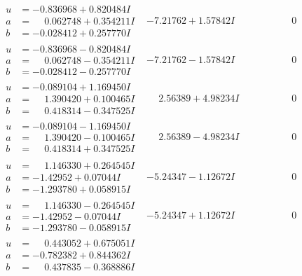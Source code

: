 \documentclass[1p]{elsarticle_modified}
\theoremstyle{definition}
\begin{document}
$$\begin{array}{c|c|c}
\begin{aligned}
u &= -0.836968 + 0.820484 I \\
a &= \phantom{-}0.062748 + 0.354211 I \\
b &= -0.028412 + 0.257770 I\end{aligned}
 & -7.21762 + 1.57842 I & \phantom{-0.000000 } 0 \\ \hline\begin{aligned}
u &= -0.836968 - 0.820484 I \\
a &= \phantom{-}0.062748 - 0.354211 I \\
b &= -0.028412 - 0.257770 I\end{aligned}
 & -7.21762 - 1.57842 I & \phantom{-0.000000 } 0 \\ \hline\begin{aligned}
u &= -0.089104 + 1.169450 I \\
a &= \phantom{-}1.390420 + 0.100465 I \\
b &= \phantom{-}0.418314 - 0.347525 I\end{aligned}
 & \phantom{-}2.56389 + 4.98234 I & \phantom{-0.000000 } 0 \\ \hline\begin{aligned}
u &= -0.089104 - 1.169450 I \\
a &= \phantom{-}1.390420 - 0.100465 I \\
b &= \phantom{-}0.418314 + 0.347525 I\end{aligned}
 & \phantom{-}2.56389 - 4.98234 I & \phantom{-0.000000 } 0 \\ \hline\begin{aligned}
u &= \phantom{-}1.146330 + 0.264545 I \\
a &= -1.42952 + 0.07044 I \\
b &= -1.293780 + 0.058915 I\end{aligned}
 & -5.24347 - 1.12672 I & \phantom{-0.000000 } 0 \\ \hline\begin{aligned}
u &= \phantom{-}1.146330 - 0.264545 I \\
a &= -1.42952 - 0.07044 I \\
b &= -1.293780 - 0.058915 I\end{aligned}
 & -5.24347 + 1.12672 I & \phantom{-0.000000 } 0 \\ \hline\begin{aligned}
u &= \phantom{-}0.443052 + 0.675051 I \\
a &= -0.782382 + 0.844362 I \\
b &= \phantom{-}0.437835 - 0.368886 I\end{aligned}

\end{array}$$
\end{document}
